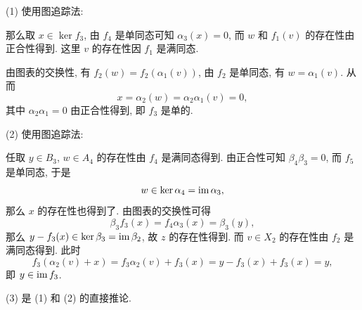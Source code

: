 \begin{Proof}
	(1) 使用图追踪法:
	\begin{center}
	\end{center}
	那么取 $ x\in\ker f_3 $, 由 $ f_4 $ 是单同态可知 $ \alpha_3(x)=0 $, 而 $ w $ 和 $ f_1(v) $ 的存在性由正合性得到. 这里 $ v $ 的存在性因 $ f_1 $ 是满同态.

	由图表的交换性, 有 $ f_2(w)=f_2(\alpha_1(v)) $, 由 $ f_2 $ 是单同态, 有 $ w=\alpha_1(v) $. 从而
	\[
		x=\alpha_2(w)=\alpha_2\alpha_1(v)=0,
	\]
	其中 $ \alpha_2\alpha_1=0 $ 由正合性得到, 即 $ f_3 $ 是单的.

	(2) 使用图追踪法:
	\begin{center}
	\end{center}
	任取 $ y\in B_3 $, $ w\in A_4 $ 的存在性由 $ f_4 $ 是满同态得到. 由正合性可知 $ \beta_4\beta_3=0 $, 而 $ f_5 $ 是单同态, 于是
	\[
		w\in\ker\alpha_4=\mathrm{im}\,\alpha_3,
	\]
	那么 $ x $ 的存在性也得到了. 由图表的交换性可得
	\[
		\beta_3f_3(x)=f_4\alpha_3(x)=\beta_3(y),
	\]
	那么 $ y-f_3(x)\in\ker\beta_3=\mathrm{im}\,\beta_2 $, 故 $ z $ 的存在性得到. 而 $ v\in X_2 $ 的存在性由 $ f_2 $ 是满同态得到. 此时
	\[
		f_3(\alpha_2(v)+x)=f_3\alpha_2(v)+f_3(x)=y-f_3(x)+f_3(x)=y,
	\]
	即 $ y\in\mathrm{im}\, f_3 $.

	(3) 是 (1) 和 (2) 的直接推论.
\end{Proof}

